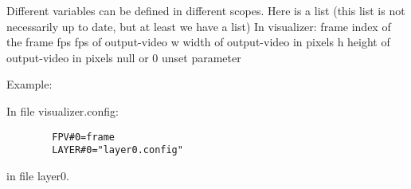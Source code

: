 \documentclass{article}
\begin{document}
      Different variables can be defined in different scopes. Here is a list (this list is not necessarily up to date, but at least we have a list)
      In visualizer:
        frame
          index of the frame
        fps
          fps of output-video
        w
          width of output-video in pixels
        h
          height of output-video in pixels
        null or 0
          unset parameter


        

      Example:

      In file visualizer.config:
      \begin{lstlisting}
        FPV#0=frame
        LAYER#0="layer0.config"
      \end{lstlisting}

      in file layer0.
\end{document}
